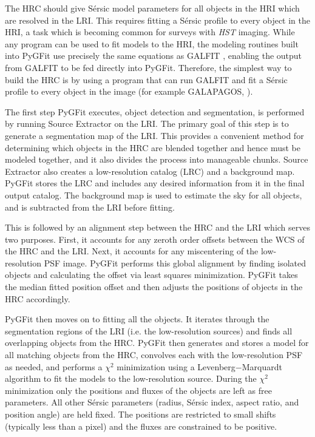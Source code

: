 \documentclass[preprint]{aastex}
\newcommand{\sersic}{S\'{e}rsic}
\newcommand{\galfit}{GALFIT}
\newcommand{\pygfit}{PyGFit}
\newcommand{\extractor}{Source Extractor}
\newcommand{\galapagos}{GALAPAGOS}
\begin{document}
The HRC should give \sersic{} model parameters for all objects in the HRI which are resolved in the LRI.  This requires fitting a \sersic{} profile to every object in the HRI, a task which is becoming common for surveys with {\itshape HST} imaging.  While any program can be used to fit models to the HRI, the modeling routines built into \pygfit{} use precisely the same equations as \galfit{} \citep{peng02,peng10}, enabling the output from \galfit{} to be fed directly into \pygfit{}.  Therefore, the simplest way to build the HRC is by using a program that can run \galfit{} and fit a \sersic{} profile to every object in the image (for example \galapagos{}, \citealt{galapagos}).

The first step \pygfit{} executes, object detection and segmentation, is performed by running \extractor{} \citep{bertin96} on the LRI.  The primary goal of this step is to generate a segmentation map of the LRI.  This provides a convenient method for determining which objects in the HRC are blended together and hence must be modeled together, and it also divides the process into manageable chunks.  \extractor{} also creates a low-resolution catalog (LRC) and a background map.  \pygfit{} stores the LRC and includes any desired information from it in the final output catalog.  The background map is used to estimate the sky for all objects, and is subtracted from the LRI before fitting.

This is followed by an alignment step between the HRC and the LRI which serves two purposes.  First, it accounts for any zeroth order offsets between the WCS of the HRC and the LRI.  Next, it accounts for any miscentering of the low-resolution PSF image.  \pygfit{} performs this global alignment by finding isolated objects and calculating the offset via least squares minimization.  \pygfit{} takes the median fitted position offset and then adjusts the positions of objects in the HRC accordingly.

\pygfit{} then moves on to fitting all the objects.  It iterates through the segmentation regions of the LRI (i.e. the low-resolution sources) and finds all overlapping objects from the HRC.  \pygfit{} then generates and stores a model for all matching objects from the HRC, convolves each with the low-resolution PSF as needed, and performs a $\chi^2$ minimization using a Levenberg$-$Marquardt algorithm to fit the models to the low-resolution source.  During the $\chi^2$ minimization only the positions and fluxes of the objects are left as free parameters.  All other \sersic{} parameters (radius, \sersic{} index, aspect ratio, and position angle) are held fixed.  The positions are restricted to small shifts (typically less than a pixel) and the fluxes are constrained to be positive.
\end{document}
